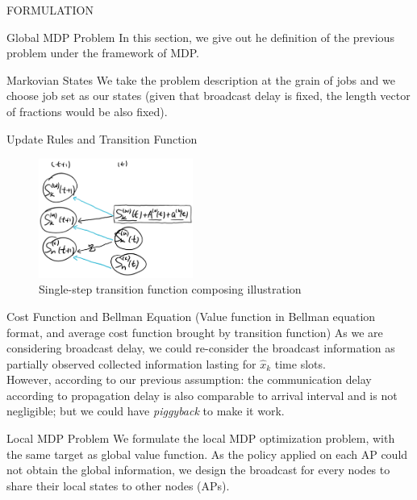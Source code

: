\documentclass[10pt, conference, letterpaper]{IEEEtran}
\begin{document}
\begin{section}{FORMULATION}
        \begin{subsection}{Global MDP Problem}
            In this section, we give out he definition of the previous problem under the framework of MDP.

            \begin{subsubsection}{Markovian States}
                We take the problem description at the grain of jobs and we choose job set as our states (given that broadcast delay is fixed, the length vector of fractions would be also fixed).
            \end{subsubsection}

            \begin{subsubsection}{Update Rules and Transition Function}
                \begin{figure}[h]
                    \label{fig:trans}
                    \centering
                    \includegraphics[width=0.45\textwidth]{single-transition.png}
                    \caption{Single-step transition function composing illustration}
                \end{figure}
            \end{subsubsection}

            \begin{subsubsection}{Cost Function and Bellman Equation}
                (Value function in Bellman equation format, and average cost function brought by transition function)
                As we are considering broadcast delay, we could re-consider the broadcast information as partially observed collected information lasting for $\hat{x}_k$ time slots.
                \\
                However, according to our previous assumption: the communication delay according to propagation delay is also comparable to arrival interval and is not negligible; but we could have \emph{piggyback} to make it work.
            \end{subsubsection}
        \end{subsection}

        \begin{subsection}{Local MDP Problem}
            We formulate the local MDP optimization problem, with the same target as global value function. As the policy applied on each AP could not obtain the global information, we design the broadcast for every nodes to share their local states to other nodes (APs).
            

\end{subsection}
\end{section}
\end{document}
